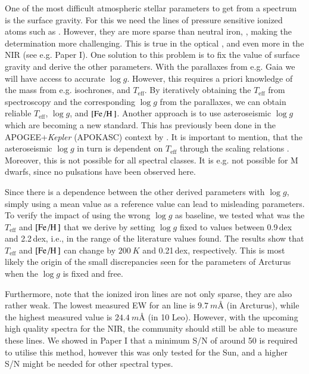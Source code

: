 \documentclass{aa}
\begin{document}
One of the most difficult atmospheric stellar parameters to get from a spectrum
is the surface gravity. For this we need the lines of pressure sensitive ionized
atoms such as . However, they are more sparse than neutral iron,
, making the determination more challenging. This is true in the
optical \citep[see e.g. the discussion by][]{Mortier2013c}, and even more in the
NIR (see e.g. Paper I). One solution to this problem is to fix the value of
surface gravity and derive the other parameters. With the parallaxes from e.g.
Gaia \citep{GAIA} we will have access to accurate $\log g$. However, this
requires a priori knowledge of the mass from e.g. isochrones, and
$T_\mathrm{eff}$. By iteratively obtaining the $T_\mathrm{eff}$ from
spectroscopy and the corresponding $\log g$ from the parallaxes, we can obtain
reliable $T_\mathrm{eff}$, $\log g$, and $[\ion{Fe}/\ion{H}]$. Another
approach is to use asteroseismic $\log g$ which are becoming a new standard.
This has previously been done in the APOGEE+\emph{Kepler} (APOKASC) context by
\citet{Pinsonneault2014,Hawkins2016}. It is important to mention, that the
asteroseismic $\log g$ in turn is dependent on $T_\mathrm{eff}$ through the
scaling relations \citep[see e.g.][]{Kjeldsen1995}. Moreover, this is not
possible for all spectral classes. It is e.g. not possible for M dwarfs, since
no pulsations have been observed here.

Since there is a dependence between the other derived parameters with $\log g$,
simply using a mean value as a reference value can lead to misleading
parameters. To verify the impact of using the wrong $\log g$ as baseline, we
tested what was the $T_\mathrm{eff}$ and $[\ion{Fe}/\ion{H}]$ that we derive by
setting $\log g$ fixed to values between 0.9\,dex and 2.2\,dex, i.e., in the
range of the literature values found. The results show that $T_\mathrm{eff}$ and
$[\ion{Fe}/\ion{H}]$ can change by $\SI{200}{K}$ and 0.21\,dex, respectively.
This is most likely the origin of the small discrepancies seen for the
parameters of Arcturus when the $\log g$ is fixed and free.

Furthermore, note that the ionized iron lines are not only sparse, they are also
rather weak. The lowest measured EW for an  line is
$\SI{9.7}{m}$\AA{} (in Arcturus), while the highest measured value is
$\SI{24.4}{m}$\AA{} (in 10 Leo). However, with the upcoming high quality spectra
for the NIR, the community should still be able to measure these 
lines. We showed in Paper I that a minimum S/N of around 50 is required to
utilise this method, however this was only tested for the Sun, and a higher S/N
might be needed for other spectral types.
\end{document}
